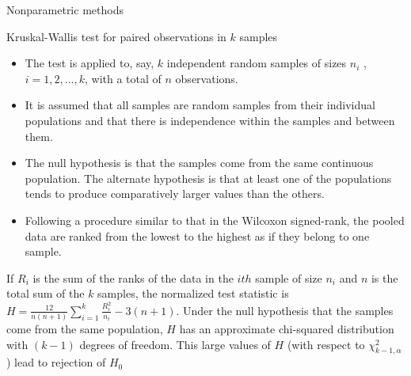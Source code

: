 \documentclass[8pt]{beamer}
\renewcommand{\emph}[1]{\textcolor{myorange}{#1}}
\begin{document}
\begin{frame}{Nonparametric methods}
    \begin{block}{Kruskal-Wallis test for paired observations in $k$ samples}
    \end{block}
    \begin{itemize}
        \item The test is applied to, say, $k$ independent \emph{random samples} of sizes $n_i$ , $i = 1, 2, \dots , k$, with a total of $n$ observations.
        \item It is assumed that all samples are \emph{random samples} from their individual populations and that there is independence within the samples and between them.
        \item The null hypothesis is that the samples come from the same continuous population. The alternate hypothesis is that at least one of the populations tends to produce comparatively larger values than the others.
        \item Following a procedure similar to that in the \emph{Wilcoxon signed-rank}, the pooled data are ranked from the lowest to the highest as if they belong to one sample.

    \end{itemize}
    If $R_i$ is the sum of the ranks of the data in the $ith$ sample of size $n_i$ and $n$ is the total sum of the $k$ samples, the normalized test statistic is $H = \frac{12}{n(n+1)} \sum_{i=1}^k \frac{R_i^2}{n_i} - 3(n+1)$. Under the \emph{null hypothesis} that the samples come from the same population, $H$ has an approximate \emph{chi-squared distribution} with $(k - 1)$  \emph{degrees of freedom}. This large values of $H$ (with respect to $\chi_{k-1,\alpha}^2$) lead to \emph{rejection} of $H_0$
   \end{frame}
\end{document}
